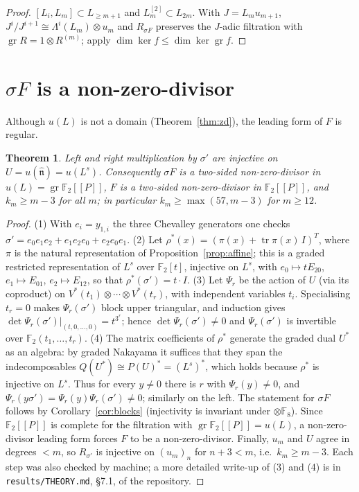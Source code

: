 \documentclass[11pt]{amsart}
\newtheorem{theorem}{Theorem}[section]
\theoremstyle{definition}
\newcommand{\F}{\mathbb{F}}
\newcommand{\gr}{\operatorname{gr}}
\newcommand{\hatn}{\widehat{\mathfrak n}}
\begin{document}
\begin{proof}
$[L_i,L_m]\subset L_{\ge m+1}$ and $L_m^{[2]}\subset L_{2m}$. With $J=L_mu_{m+1}$, $J^i/J^{i+1}\cong\Lambda^i(L_m)\otimes u_m$
and $R_{\sigma F}$ preserves the $J$-adic filtration with $\gr R=1\otimes R^{(m)}$; apply $\dim\ker f\le\dim\ker\gr f$.
\end{proof}

\section{$\sigma F$ is a non-zero-divisor}\label{sec:nzd}

Although $u(L)$ is not a domain (Theorem~\ref{thm:zd}), the leading form of $F$ is regular.

\begin{theorem}\label{thm:nzd}
Left and right multiplication by $\sigma'$ are injective on $U=u(\hatn)=u(L^s)$. Consequently $\sigma F$ is a two-sided
non-zero-divisor in $u(L)=\gr\F_2[[P]]$, $F$ is a two-sided non-zero-divisor in $\F_2[[P]]$, and $k_m\ge m-3$ for all
$m$; in particular $k_m\ge\max(57,m-3)$ for $m\ge12$.
\end{theorem}

\begin{proof}
(1) With $e_i=y_{1,i}$ the three Chevalley generators one checks $\sigma'=e_0e_1e_2+e_1e_2e_0+e_2e_0e_1$.
(2) Let $\rho^*(x)=(\pi(x)+\operatorname{tr}\pi(x)\,I)^{T}$, where $\pi$ is the natural representation of
Proposition~\ref{prop:affine}; this is a graded restricted representation of $L^s$ over $\F_2[t]$, injective on $L^s$,
with $e_0\mapsto tE_{20}$, $e_1\mapsto E_{01}$, $e_2\mapsto E_{12}$, so that $\rho^*(\sigma')=t\cdot I$.
(3) Let $\Psi_r$ be the action of $U$ (via its coproduct) on $V^*(t_1)\otimes\cdots\otimes V^*(t_r)$, with independent
variables $t_i$. Specialising $t_r=0$ makes $\Psi_r(\sigma')$ block upper triangular, and induction gives
$\det\Psi_r(\sigma')|_{(t,0,\dots,0)}=t^{3^r}$; hence $\det\Psi_r(\sigma')\ne0$ and $\Psi_r(\sigma')$ is invertible over
$\F_2(t_1,\dots,t_r)$.
(4) The matrix coefficients of $\rho^*$ generate the graded dual $U^*$ as an algebra: by graded Nakayama it suffices
that they span the indecomposables $Q(U^*)\cong P(U)^*=(L^s)^*$, which holds because $\rho^*$ is injective on $L^s$.
Thus for every $y\ne0$ there is $r$ with $\Psi_r(y)\ne0$, and $\Psi_r(y\sigma')=\Psi_r(y)\Psi_r(\sigma')\ne0$; similarly
on the left. The statement for $\sigma F$ follows by Corollary~\ref{cor:blocks} (injectivity is invariant under
$\otimes\F_8$). Since $\F_2[[P]]$ is complete for the filtration with $\gr\F_2[[P]]=u(L)$, a non-zero-divisor leading
form forces $F$ to be a non-zero-divisor. Finally, $u_m$ and $U$ agree in degrees $<m$, so $R_{\sigma'}$ is injective on $(u_m)_n$ for
$n+3<m$, i.e.\ $k_m\ge m-3$. Each step was also checked by machine; a more detailed write-up of (3) and (4) is in
\texttt{results/THEORY.md}, \S7.1, of the repository.
\end{proof}
\end{document}
